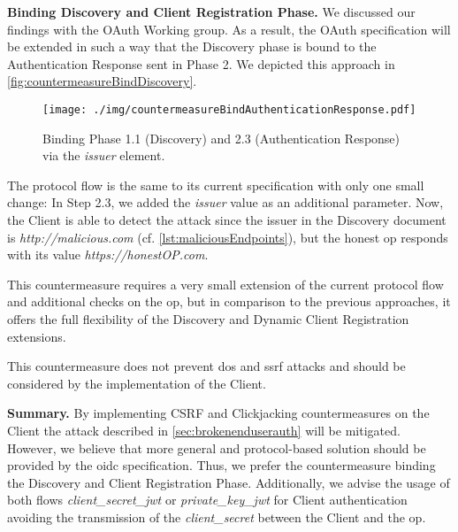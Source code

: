 \documentclass[conference,compsoc]{IEEEtran}
\renewcommand*{\paragraph}[1]{\vspace{2mm}\noindent\textbf{#1.}}
\begin{document}
\paragraph{Binding Discovery and Client Registration Phase}
We discussed our findings with the OAuth Working group.
As a result, the OAuth  specification will be extended in such a way that the Discovery phase is bound to the Authentication Response sent in Phase 2.
We depicted this approach in \autoref{fig:countermeasureBindDiscovery}.


\begin{figure}[!ht]
	\centering
	\texttt{[image: ./img/countermeasureBindAuthenticationResponse.pdf]}
\caption{Binding Phase 1.1 (Discovery) and 2.3 (Authentication Response) via the \emph{issuer} element.}
	\label{fig:countermeasureBindDiscovery}
\end{figure}

The protocol flow is the same to its current specification with only one small change:
In Step 2.3, we added the \emph{issuer} value as an additional parameter.
Now, the Client is able to detect the attack since the issuer in the Discovery document is \emph{http://malicious.com} (cf. \autoref{lst:maliciousEndpoints}), but the honest \gls{op} responds with its value \emph{https://honestOP.com}.

This countermeasure requires a very small extension of the current protocol flow and additional checks on the \gls{op}, but in comparison to the previous approaches, it offers the full flexibility of the Discovery and Dynamic Client Registration extensions.


This countermeasure does not prevent \gls{dos} and \gls{ssrf} attacks and should be considered by the implementation of the Client.

\paragraph{Summary}
By implementing CSRF and Clickjacking countermeasures on the Client the attack described in \autoref{sec:brokenenduserauth} will be mitigated. 
However, we believe that more general and protocol-based solution should be provided by the \gls{oidc} specification.
Thus, we prefer the countermeasure binding the Discovery and Client Registration Phase.
Additionally, we advise the usage of both flows \emph{client\_secret\_jwt} or \emph{private\_key\_jwt} for Client authentication avoiding the transmission of the \emph{client\_secret} between the Client and the \gls{op}.
\end{document}
